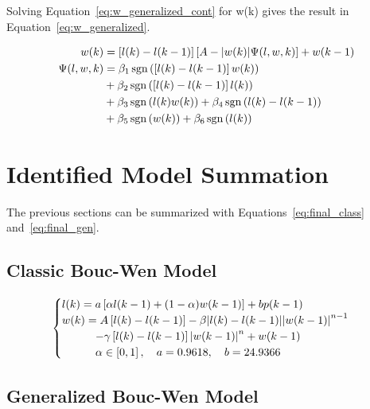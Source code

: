 Solving Equation~\ref{eq:w_generalized_cont} for w(k) gives the result in Equation~\ref{eq:w_generalized}.

\begin{equation}
\begin{split}
w(k) &= \left[l(k)-l(k-1)\right]\left[A-\abs{w(k)}\Psi(l,w,k)\right]+w(k-1) \\
\Psi(l,w,k) &= \beta_1\operatorname{sgn}\left(\left[l(k)-l(k-1)\right]w(k)\right) \\
&+\beta_2\operatorname{sgn}\left(\left[l(k)-l(k-1)\right]l(k)\right) \\
&+\beta_3\operatorname{sgn}\left(l(k)w(k)\right) + \beta_4\operatorname{sgn}\left(l(k)-l(k-1)\right) \\
&+\beta_5 \operatorname{sgn}\left(w(k)\right) + \beta_6 \operatorname{sgn}\left(l(k)\right)
\end{split}
\label{eq:w_generalized}
\end{equation}

\section{Identified Model Summation}

The previous sections can be summarized with Equations~\ref{eq:final_class} and~\ref{eq:final_gen}.

\subsection{Classic Bouc-Wen Model}

\begin{equation}
	\begin{cases}
		l(k) = a \left [\alpha l(k-1) + (1-\alpha)w(k-1) \right] + bp(k-1) \\
		w(k) = A\left[l(k)-l(k-1)\right] - \beta \abs{l(k)-l(k-1)}\abs{w(k-1)}^{n-1} \\
		\qquad \quad- \gamma \left[l(k)-l(k-1)\right]\abs{w(k-1)}^n + w(k-1) \\
		\qquad \quad \alpha \in \left[0,1\right],\quad a = 0.9618, \quad b=24.9366
	\end{cases}
	\label{eq:final_class}
\end{equation}

\subsection{Generalized Bouc-Wen Model}

